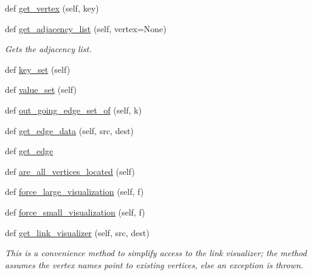 \begin{DoxyCompactItemize}
def \hyperlink{classbridges_1_1graph__adj__list_1_1_graph_adj_list_af484d881d91177e723faf8b8a5c427e2}{get\+\_\+vertex} (self, key)
\item 
def \hyperlink{classbridges_1_1graph__adj__list_1_1_graph_adj_list_a523adce952c66505abc5ad14a83ae4c4}{get\+\_\+adjacency\+\_\+list} (self, vertex=None)
\begin{DoxyCompactList}\small\item\em Gets the adjacency list. \end{DoxyCompactList}\item 
def \hyperlink{classbridges_1_1graph__adj__list_1_1_graph_adj_list_a96e264e71acad7474e233a1ec1d1035a}{key\+\_\+set} (self)
\item 
def \hyperlink{classbridges_1_1graph__adj__list_1_1_graph_adj_list_ae12db7b48cf37ba8d2852fa05ebaa2c0}{value\+\_\+set} (self)
\item 
def \hyperlink{classbridges_1_1graph__adj__list_1_1_graph_adj_list_a4ae90f3f2db5f44219fe2a6f9035c9d6}{out\+\_\+going\+\_\+edge\+\_\+set\+\_\+of} (self, k)
\item 
def \hyperlink{classbridges_1_1graph__adj__list_1_1_graph_adj_list_abf7a65867ab342ef0eda4a34b3fe011e}{get\+\_\+edge\+\_\+data} (self, src, dest)
\item 
def \hyperlink{classbridges_1_1graph__adj__list_1_1_graph_adj_list_a2f4c60fcaa52adcb509b3bb8138bc3a1}{get\+\_\+edge}
\item 
def \hyperlink{classbridges_1_1graph__adj__list_1_1_graph_adj_list_a9041f2a5c754141afbc41f02c6a2771c}{are\+\_\+all\+\_\+vertices\+\_\+located} (self)
\item 
def \hyperlink{classbridges_1_1graph__adj__list_1_1_graph_adj_list_aa0eaa5a21f8d8905d02454a83151c20e}{force\+\_\+large\+\_\+visualization} (self, f)
\item 
def \hyperlink{classbridges_1_1graph__adj__list_1_1_graph_adj_list_a036b6368bf916474da748e96dd93ec5a}{force\+\_\+small\+\_\+visualization} (self, f)
\item 
def \hyperlink{classbridges_1_1graph__adj__list_1_1_graph_adj_list_abaa3015ae78e0f5ebc6fd2d2d2772927}{get\+\_\+link\+\_\+visualizer} (self, src, dest)
\begin{DoxyCompactList}\small\item\em This is a convenience method to simplify access to the link visualizer; the method assumes the vertex names point to existing vertices, else an exception is thrown. \end{DoxyCompactList}\item 

\end{DoxyCompactItemize}
